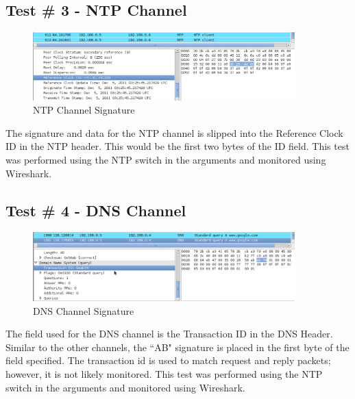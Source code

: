 \documentclass[titlepage]{article}
\begin{document}
\clearpage

\subsection{Test \# 3 - NTP Channel}

\begin{figure}[htb]                                                                       
  \begin{center}
    \includegraphics[width=0.9\textwidth]{Pictures/NTP_SIG.png}
  \end{center}
  \caption{NTP Channel Signature}
  \label{fig:ntp_sig}
\end{figure}

The signature and data for the NTP channel is slipped into the Reference Clock ID in the NTP header.
This would be the first two bytes of the ID field.  This test was performed using the NTP switch
in the arguments and monitored using Wireshark.

\subsection{Test \# 4 - DNS Channel}

\begin{figure}[htb]                                                                       
  \begin{center}
    \includegraphics[width=0.9\textwidth]{Pictures/DNS_SIG.png}
  \end{center}
  \caption{DNS Channel Signature}
  \label{fig:dns_sig}
\end{figure}

The field used for the DNS channel is the Transaction ID in the DNS Header.  Similar to the other channels,
the ``AB" signature is placed in the first byte of the field specified.  The transaction id is used to 
match request and reply packets; however, it is not likely monitored.  This test was performed using the NTP
switch in the arguments and monitored using Wireshark.\\
\end{document}
